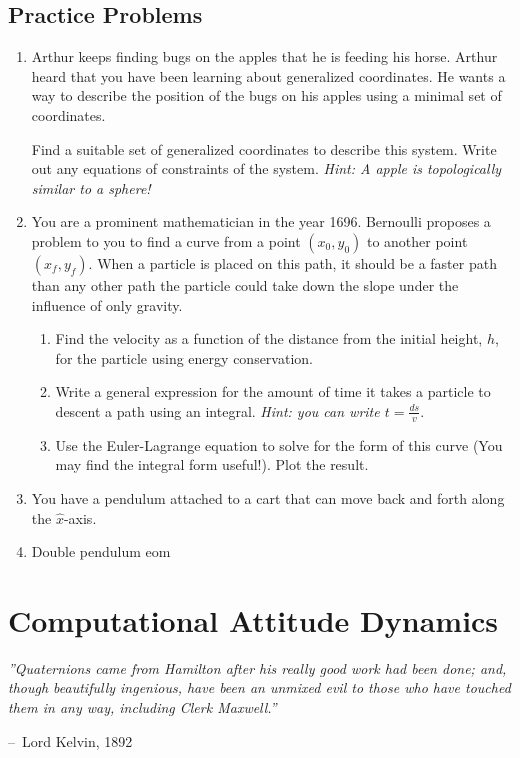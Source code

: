 \documentclass[12pt]{report}
\makeatletter
\newenvironment{chapquote}[2][2em]
  {\setlength{\@tempdima}{#1}%
   \def\chapquote@author{#2}%
   \parshape 1 \@tempdima \dimexpr\textwidth-2\@tempdima\relax%
   \itshape}
  {\par\normalfont\hfill--\ \chapquote@author\hspace*{\@tempdima}\par\bigskip}
\makeatother
\begin{document}
\section{Practice Problems}
\begin{enumerate}
    \item Arthur keeps finding bugs on the apples that he is feeding his horse. Arthur heard that you have been learning about generalized coordinates. He wants a way to describe the position of the bugs on his apples using a minimal set of coordinates.

Find a suitable set of generalized coordinates to describe this system. Write out any equations of constraints of the system. \textit{Hint: A apple is topologically similar to a sphere!}

    \item You are a prominent mathematician in the year 1696. Bernoulli proposes a problem to you to find a curve from a point $(x_0,y_0)$ to another point $\left(x_f,y_f\right)$. When a particle is placed on this path, it should be a faster path than any other path the particle could take down the slope under the influence of only gravity.
\begin{enumerate}
    \item Find the velocity as a function of the distance from the initial height, $h$, for the particle using energy conservation.
    \item Write a general expression for the amount of time it takes a particle to descent a path using an integral. \textit{Hint: you can write $t=\frac{ds}{v}$}.
    \item Use the Euler-Lagrange equation to solve for the form of this curve (You may find the integral form useful!). Plot the result.
\end{enumerate}

\item You have a pendulum attached to a cart that can move back and forth along the $\hat{x}$-axis. 
\item Double pendulum \gls{eom}

\end{enumerate}
\chapter{Computational Attitude Dynamics}\label{sec:attitude dynamics}
\begin{chapquote}{Lord Kelvin, 1892}
''Quaternions came from Hamilton after his really good work had been done; and, though beautifully ingenious, have been an unmixed evil to those who have touched them in any way, including Clerk Maxwell.''
\end{chapquote}
\end{document}
